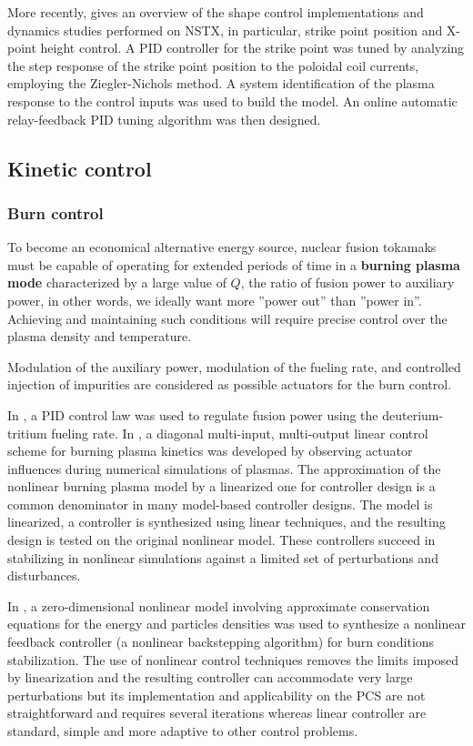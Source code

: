 \documentclass[12pt,lot, lof]{puthesis}
\begin{document}
More recently, \cite{Kolemen11} gives an overview of the shape control implementations and dynamics studies  performed on NSTX, in particular, strike point position and X-point height control.
A PID controller for the strike point was tuned by analyzing the step response of the strike point position to the poloidal coil currents, employing the Ziegler-Nichols method. A system identification of the plasma response to the control inputs was used to build the model. An online automatic relay-feedback PID tuning algorithm was then designed.


\subsection{Kinetic control}


\subsubsection{{Burn control}} 
To become an economical alternative energy source, nuclear fusion tokamaks must be capable of operating for extended periods of time in a \textbf{burning plasma mode} characterized by a large value of $Q$, the ratio of fusion power to auxiliary power, in other words, we ideally want more ''power out'' than ''power in''. Achieving and maintaining such conditions will require precise control over the plasma density and temperature.

Modulation of the auxiliary power, modulation of the fueling rate, and controlled injection of impurities are considered as possible actuators for the burn control.

In \cite{Mitarai10}, a PID control law was used to regulate fusion power using the deuterium-tritium fueling rate.
In \cite{Leonov05}, a diagonal multi-input, multi-output linear control scheme for burning plasma kinetics was developed by observing actuator influences during numerical simulations of plasmas.
The approximation of the nonlinear burning plasma model by a linearized one for controller design is a common denominator in many model-based controller designs. The model is linearized, a controller is synthesized using linear techniques, and the resulting design is tested on the original nonlinear model. 
These controllers succeed in stabilizing in nonlinear simulations against a limited set of perturbations and disturbances.

In \cite{Schuster03}, a zero-dimensional nonlinear model involving approximate conservation equations for the energy and particles densities was used to synthesize a nonlinear feedback controller (a nonlinear backstepping algorithm) for burn conditions stabilization. The use of nonlinear control techniques removes the limits imposed by linearization and the resulting controller can accommodate very large perturbations but its implementation and applicability on the PCS are not straightforward and requires several iterations whereas linear controller are standard, simple and more adaptive to other control problems.
\end{document}
